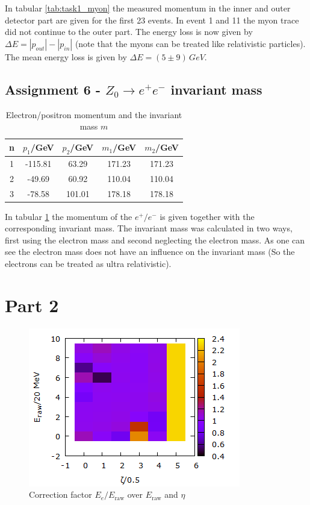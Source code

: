 In tabular \ref{tab:task1_myon} the measured momentum in the inner and outer detector part are given for the first 23 events. In event 1 and 11 the myon trace did not continue to the outer part. The energy loss is now given by $\Delta E = |p_{out}| - |p_{in}|$ (note that the myons can be treated like relativistic particles). The mean energy loss is given by $\Delta E = \si{(5 \pm 9)\,GeV}$.

\subsection{Assignment 6 - $Z_0 \to e^+ e^-$ invariant mass}
\begin{table}
\centering
\caption{Electron/positron momentum and the invariant mass $m$}
\begin{tabular}{ccccc}
\toprule
n & $p_1$/GeV & $p_2$/GeV & $m_1$/GeV & $m_2$/GeV\\
\midrule
1 &	-115.81&	63.29 & 171.23 & 171.23\\ 
2&	-49.69&	60.92 & 110.04 & 110.04\\
3&	-78.58&	101.01& 178.18 & 178.18\\
\bottomrule
\end{tabular}
\label{tab:task1_zee}
\end{table}

In tabular \ref{tab:task1_zee} the momentum of the $e^+/e^-$ is given together with the corresponding invariant mass. The invariant mass was calculated in two ways, first using the electron mass and second neglecting the electron mass. As one can see the electron mass does not have an influence on the invariant mass (So the electrons can be treated as ultra relativistic). 

\section{Part 2}
\begin{figure}
\centering
\includegraphics[scale=1]{data/zee_init/zee_init.png}
\caption{Correction factor $E_e/E_{\mathrm{raw}}$ over $E_{\mathrm{raw}}$ and $\eta$}
\label{fig:part2_factor}
\end{figure}

